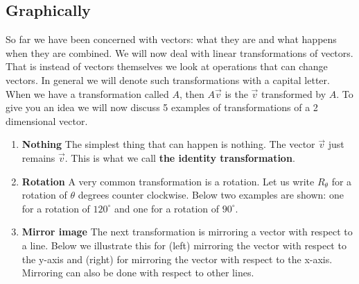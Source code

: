 \documentclass[a4paper]{report}
\begin{document}
\subsection{Graphically}\label{sec:linal:mat:gr}
So far we have been concerned with vectors: what they are and what happens when they are combined. We will now deal with linear transformations of vectors. That is instead of vectors themselves we look at operations that can change vectors. In general we will denote such transformations with a capital letter. When we have a transformation called $A$, then $A\vec{v}$ is the $\vec{v}$ transformed by $A$. To give you an idea we will now discuss 5 examples of transformations of a 2 dimensional vector.
\begin{enumerate}
\item \textbf{Nothing} The simplest thing that can happen is nothing. The vector $\vec{v}$ just remains $\vec{v}$. This is what we call \textbf{the identity transformation}.
\item \textbf{Rotation} A very common transformation is a rotation. Let us write $R_\theta$ for a rotation of $\theta$ degrees counter clockwise. Below two examples are shown: one for a rotation of $120^\circ$ and one for a rotation of $90^\circ$.
\hspace{1cm}
\item \textbf{Mirror image} The next transformation is mirroring a vector with respect to a line. Below we illustrate this for (left) mirroring the vector with respect to the y-axis and (right) for mirroring the vector with respect to the x-axis. Mirroring can also be done with respect to other lines.
\end{enumerate}
\end{document}
